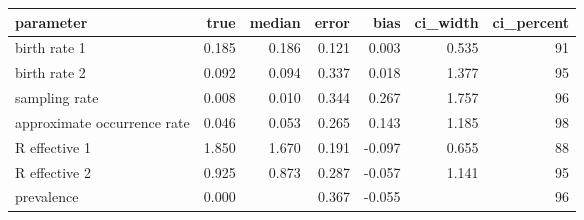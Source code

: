 \begin{table}[ht]
\centering
\begin{tabular}{lrrrrrr}
  \hline
parameter & true & median & error & bias & ci\_width & ci\_percent \\ 
  \hline
birth rate 1 & 0.185 & 0.186 & 0.121 & 0.003 & 0.535 & 91 \\ 
  birth rate 2 & 0.092 & 0.094 & 0.337 & 0.018 & 1.377 & 95 \\ 
  sampling rate & 0.008 & 0.010 & 0.344 & 0.267 & 1.757 & 96 \\ 
  approximate occurrence rate & 0.046 & 0.053 & 0.265 & 0.143 & 1.185 & 98 \\ 
  R effective 1 & 1.850 & 1.670 & 0.191 & -0.097 & 0.655 & 88 \\ 
  R effective 2 & 0.925 & 0.873 & 0.287 & -0.057 & 1.141 & 95 \\ 
  prevalence & 0.000 &  & 0.367 & -0.055 &  & 96 \\ 
   \hline
\end{tabular}
\end{table}
